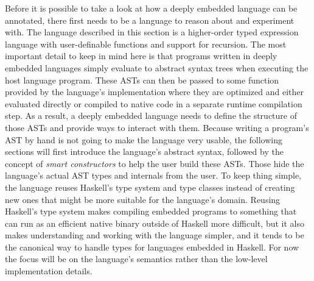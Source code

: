 \documentclass[fontsize=11pt,a4paper,parskip=half,numbers=noenddot]{scrartcl}
\begin{document}
Before it is possible to take a look at how a deeply embedded language can be
annotated, there first needs to be a language to reason about and experiment
with. The language described in this section is a higher-order typed expression
language with user-definable functions and support for recursion. The most
important detail to keep in mind here is that programs written in deeply
embedded languages simply evaluate to abstract syntax trees when executing the
host language program. These ASTs can then be passed to some function provided
by the language's implementation where they are optimized and either evaluated
directly or compiled to native code in a separate runtime compilation step. As a
result, a deeply embedded language needs to define the structure of those ASTs
and provide ways to interact with them. Because writing a program's AST by hand
is not going to make the language very usable, the following sections will first
introduce the language's abstract syntax, followed by the concept of \emph{smart
  constructors} to help the user build these ASTs. Those hide the language's
actual AST types and internals from the user. To keep thing simple, the language
reuses Haskell's type system and type classes instead of creating new ones that
might be more suitable for the language's domain. Reusing Haskell's type system
makes compiling embedded programs to something that can run as an efficient
native binary outside of Haskell more difficult, but it also makes understanding
and working with the language simpler, and it tends to be the canonical way to
handle types for languages embedded in Haskell. For now the focus will be on the
language's semantics rather than the low-level implementation details.
\end{document}
